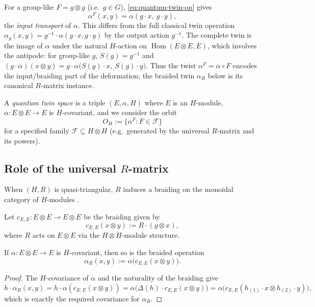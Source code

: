 \documentclass[11pt,a4paper]{article}
\numberwithin{equation}{section}
\DeclareMathOperator{\Hom}{Hom}
\newcommand{\TwinOrbit}{O}
\begin{document}
	\begin{remark}
		For a group-like $F=g\otimes g$ (i.e.\ $g\in G$), \eqref{eq:quantum-twin-op} gives
		\[
		\alpha^F(x,y) = \alpha(g\cdot x,\ g\cdot y),
		\]
		the \emph{input transport} of $\alpha$. This differs from the full classical twin operation
		$\alpha_g(x,y) = g^{-1}\cdot\alpha(g\cdot x,g\cdot y)$ by the output action $g^{-1}$. The complete
		twin is the image of $\alpha$ under the natural $H$-action on $\Hom(E\otimes E,E)$, which involves
		the antipode: for group-like $g$, $S(g)=g^{-1}$ and
		$(g\cdot\alpha)(x\otimes y)=g\cdot\alpha\big(S(g)\cdot x,\ S(g)\cdot y\big)$. Thus the twist
		$\alpha^F=\alpha\circ F$ encodes the input/braiding part of the deformation; the braided twin
		$\alpha_R$ below is its canonical $R$-matrix instance.
	\end{remark}
	
	\begin{definition}
		A \emph{quantum twin space} is a triple $(E,\alpha,H)$ where $E$ is an $H$-module,
		$\alpha:E\otimes E\to E$ is $H$-covariant, and we consider the orbit
		\[
		\TwinOrbit_H := \{\alpha^F : F\in \mathcal{F}\}
		\]
		for a specified family $\mathcal{F}\subseteq H\otimes H$ (e.g.\ generated by the universal $R$-matrix
		and its powers).
	\end{definition}
	
	\subsection{Role of the universal $R$-matrix}
	
	When $(H,R)$ is quasi-triangular, $R$ induces a braiding on the monoidal category of $H$-modules
	\cite{Drinfeld1986,ChariPressley1994,Kassel1995}.
	
	\begin{definition}
		Let $c_{E,E}:E\otimes E\to E\otimes E$ be the braiding given by
		\[
		c_{E,E}(x\otimes y) := R\cdot (y\otimes x),
		\]
		where $R$ acts on $E\otimes E$ via the $H\otimes H$-module structure.
	\end{definition}
	
	\begin{proposition}
		If $\alpha:E\otimes E\to E$ is $H$-covariant, then so is the braided operation
		\[
		\alpha_R(x,y) := \alpha\big(c_{E,E}(x\otimes y)\big).
		\]
	\end{proposition}
	
	\begin{proof}
		The $H$-covariance of $\alpha$ and the naturality of the braiding give
		\[
		h\cdot \alpha_R(x,y)
		= h\cdot \alpha(c_{E,E}(x\otimes y))
		= \alpha\big( \Delta(h)\cdot c_{E,E}(x\otimes y)\big)
		= \alpha\big( c_{E,E}(h_{(1)}\cdot x\otimes h_{(2)}\cdot y)\big),
		\]
		which is exactly the required covariance for $\alpha_R$.
	\end{proof}
	
\end{document}
